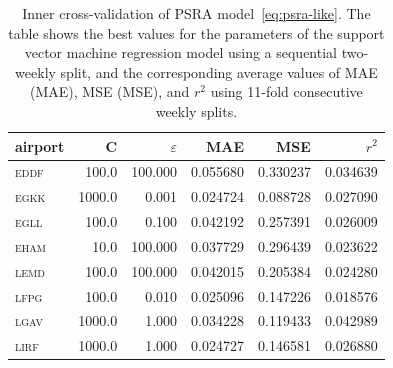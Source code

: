\documentclass[]{elsarticle}
\newcommand{\airp}[1]{\textcolor{#1}{\textsc{#1}}}
\begin{document}
\begin{table}
  \caption{Inner cross-validation of \acs{PSRA} model~\eqref{eq:psra-like}. The table shows the best values for the parameters of the support vector machine regression model using a sequential two-weekly split, and the corresponding average values of \acl{MAE} (\acs{MAE}), \acl{MSE} (\acs{MSE}), and \(r^2\) using 11-fold consecutive weekly splits.}\label{tab:inner_cv}
  \centering
  \begin{tabular}{lrrrrr}
    \toprule
    airport &       C &    \(\varepsilon\) &       \acs{MAE} &       \acs{MSE} &        \(r^2\) \\
    \midrule
    \airp{eddf} &   100.0 &  100.000 &  0.055680 &  0.330237 &  0.034639 \\
    \airp{egkk} &  1000.0 &    0.001 &  0.024724 &  0.088728 &  0.027090 \\
    \airp{egll} &   100.0 &    0.100 &  0.042192 &  0.257391 &  0.026009 \\
    \airp{eham} &    10.0 &  100.000 &  0.037729 &  0.296439 &  0.023622 \\
    \airp{lemd} &   100.0 &  100.000 &  0.042015 &  0.205384 &  0.024280 \\
    \airp{lfpg} &   100.0 &    0.010 &  0.025096 &  0.147226 &  0.018576 \\
    \airp{lgav} &  1000.0 &    1.000 &  0.034228 &  0.119433 &  0.042989 \\
    \airp{lirf} &  1000.0 &    1.000 &  0.024727 &  0.146581 &  0.026880 \\
    \bottomrule
  \end{tabular}
\end{table}
\end{document}
